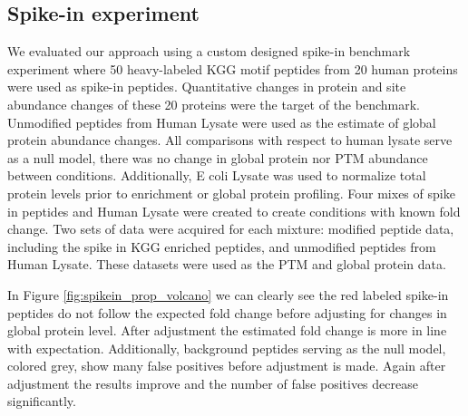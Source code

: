 \documentclass[mcp]{article}
\numberwithin{figure}{section} %
\numberwithin{table}{section}
\def\todo#1{{\color{red}[#1]}}
\begin{document}

\subsection*{Spike-in experiment}

We evaluated our approach using a custom designed spike-in benchmark experiment where 50 heavy-labeled KGG motif peptides from 20 human proteins were used as spike-in peptides. Quantitative changes in protein and site abundance changes of these 20 proteins were the target of the benchmark. Unmodified peptides from Human Lysate were used as the estimate of global protein abundance changes. All comparisons with respect to human lysate serve as a null model, there was no change in global protein nor PTM abundance between conditions. Additionally, E coli Lysate was used to normalize total protein levels prior to enrichment or global protein profiling. Four mixes of spike in peptides and Human Lysate were created to create conditions with known fold change. Two sets of data were acquired for each mixture: modified peptide data, including the spike in KGG enriched peptides, and unmodified peptides from Human Lysate. These datasets were used as the PTM and global protein data.

In Figure \ref{fig:spikein_prop_volcano} we can clearly see the red labeled spike-in peptides do not follow the expected fold change before adjusting for changes in global protein level. After adjustment the estimated fold change is more in line with expectation. Additionally, background peptides serving as the null model, colored grey, show many false positives before adjustment is made. Again after adjustment the results improve and the number of false positives decrease significantly. 
\end{document}
